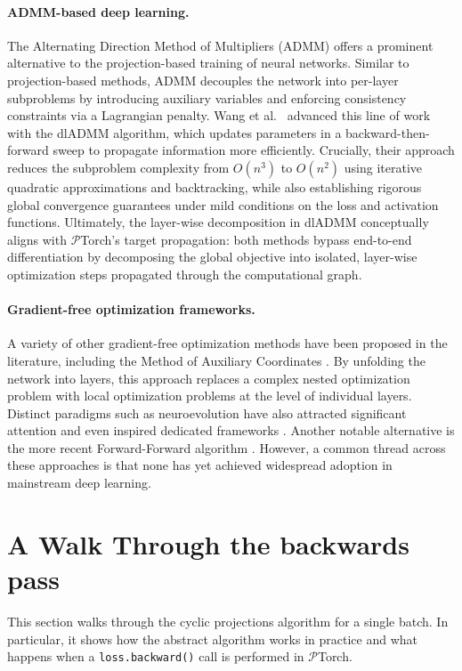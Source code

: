\documentclass{article}
\begin{document}
\paragraph{ADMM-based deep learning.}
The Alternating Direction Method of Multipliers (ADMM)\cite{neal2011distributed} offers a prominent alternative to the projection-based training of neural networks. Similar to projection-based methods, ADMM decouples the network into per-layer subproblems by introducing auxiliary variables and enforcing consistency constraints via a Lagrangian penalty. Wang et al.~\cite{10.1145/3292500.3330936} advanced this line of work with the dlADMM algorithm, which updates parameters in a backward-then-forward sweep to propagate information more efficiently. Crucially, their approach reduces the subproblem complexity from $O(n^3)$ to $O(n^2)$ using iterative quadratic approximations and backtracking, while also establishing rigorous global convergence guarantees under mild conditions on the loss and activation functions. Ultimately, the layer-wise decomposition in dlADMM conceptually aligns with $\mathcal{P}$Torch's target propagation: both methods bypass end-to-end differentiation by decomposing the global objective into isolated, layer-wise optimization steps propagated through the computational graph.

\paragraph{Gradient-free optimization frameworks.}
A variety of other gradient-free optimization methods have been proposed in the literature, including the Method of Auxiliary Coordinates \cite{carreira2014distributed}. By unfolding the network into layers, this approach replaces a complex nested optimization problem with local optimization problems at the level of individual layers. Distinct paradigms such as neuroevolution have also attracted significant attention and even inspired dedicated frameworks \cite{tang2022evojax}. Another notable alternative is the more recent Forward-Forward algorithm \cite{hinton2022forward}. However, a common thread across these approaches is that none has yet achieved widespread adoption in mainstream deep learning.

\section{A Walk Through the backwards pass}
\label{app:walk-through}

This section walks through the cyclic projections algorithm for a single batch. In particular, it shows how the abstract algorithm works in practice and what happens when a \texttt{loss.backward()} call is performed in $\mathcal{P}$Torch.
 
\end{document}
